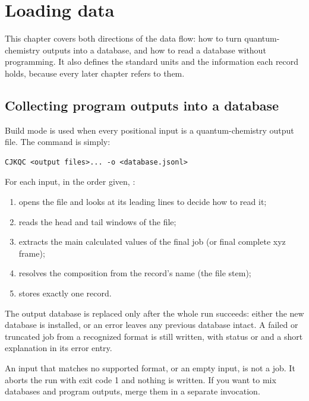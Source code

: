 \section{Loading data}\label{sec:loading}

This chapter covers both directions of the data flow: how to turn
quantum-chemistry outputs into a database, and how to read a database
without programming. It also defines the standard units and the information
each record holds, because every later chapter refers to them.

\subsection{Collecting program outputs into a database}\label{sec:collecting}

Build mode is used when every positional input is a quantum-chemistry output
file. The command is simply:

\begin{verbatim}
CJKQC <output files>... -o <database.jsonl>
\end{verbatim}

For each input, in the order given, \CJKQC{}:

\begin{enumerate}
  \item opens the file and looks at its leading lines to decide how to read
        it;
  \item reads the head and tail windows of the file;
  \item extracts the main calculated values of the final job (or final
        complete xyz frame);
  \item resolves the composition from the record's name (the file stem);
  \item stores exactly one record.
\end{enumerate}

The output database is replaced only after the whole run succeeds: either the
new database is installed, or an error leaves any previous database intact. A
failed or truncated job from a recognized format is still written, with status
 or  and a short explanation in its error entry.

\begin{warning}
An input that matches no supported format, or an empty input, is not a job. It
aborts the run with exit code 1 and nothing is written. If you want to mix
databases and program outputs, merge them in a separate invocation.
\end{warning}

